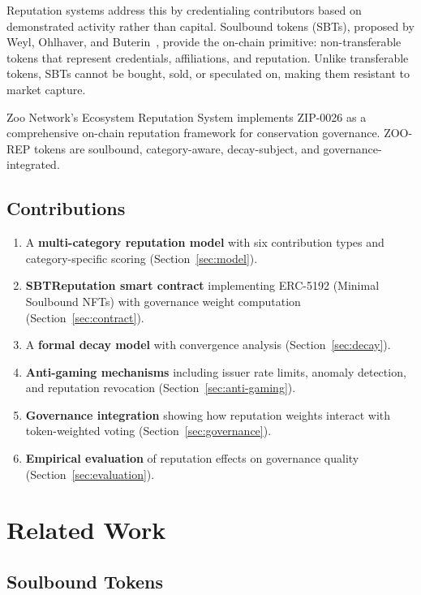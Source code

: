 \documentclass[11pt,letterpaper]{article}
\begin{document}
Reputation systems address this by credentialing contributors based on demonstrated activity rather than capital. Soulbound tokens (SBTs), proposed by Weyl, Ohlhaver, and Buterin~\cite{weyl2022decentralized}, provide the on-chain primitive: non-transferable tokens that represent credentials, affiliations, and reputation. Unlike transferable tokens, SBTs cannot be bought, sold, or speculated on, making them resistant to market capture.

Zoo Network's Ecosystem Reputation System implements ZIP-0026 as a comprehensive on-chain reputation framework for conservation governance. ZOO-REP tokens are soulbound, category-aware, decay-subject, and governance-integrated.

\subsection{Contributions}

\begin{enumerate}
    \item A \textbf{multi-category reputation model} with six contribution types and category-specific scoring (Section~\ref{sec:model}).
    \item \textbf{SBTReputation smart contract} implementing ERC-5192 (Minimal Soulbound NFTs) with governance weight computation (Section~\ref{sec:contract}).
    \item A \textbf{formal decay model} with convergence analysis (Section~\ref{sec:decay}).
    \item \textbf{Anti-gaming mechanisms} including issuer rate limits, anomaly detection, and reputation revocation (Section~\ref{sec:anti-gaming}).
    \item \textbf{Governance integration} showing how reputation weights interact with token-weighted voting (Section~\ref{sec:governance}).
    \item \textbf{Empirical evaluation} of reputation effects on governance quality (Section~\ref{sec:evaluation}).
\end{enumerate}

\section{Related Work}
\label{sec:related}

\subsection{Soulbound Tokens}
\end{document}
